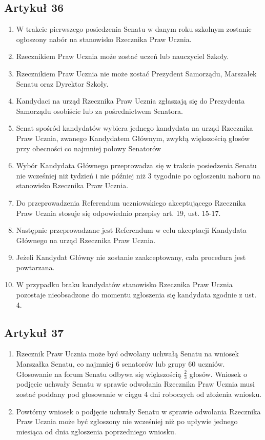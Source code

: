 \documentclass[14pt]{article}
\newenvironment{ustepy}{%
	\begin{enumerate}[leftmargin=1.5em, itemindent=1pt, labelwidth=1em, itemsep=5pt]
	}{%
	\end{enumerate}
}
\begin{document}
\subsection*{Artykuł 36}
\begin{ustepy}
	\item W trakcie pierwszego posiedzenia Senatu w danym roku szkolnym zostanie ogłoszony nabór na stanowisko Rzecznika Praw Ucznia.
	\item Rzecznikiem Praw Ucznia może zostać uczeń lub nauczyciel Szkoły.
	\item Rzecznikiem Praw Ucznia nie może zostać Prezydent Samorządu, Marszałek Senatu oraz Dyrektor Szkoły.
	\item Kandydaci na urząd Rzecznika Praw Ucznia zgłaszają się do Prezydenta  Samorządu osobiście lub za pośrednictwem Senatora.
	\item Senat spośród kandydatów wybiera jednego kandydata na urząd Rzecznika Praw Ucznia, zwanego Kandydatem Głównym, zwykłą większością głosów przy obecności co najmniej połowy Senatorów
	\item Wybór Kandydata Głównego przeprowadza się w trakcie posiedzenia Senatu nie wcześniej niż tydzień i nie później niż 3 tygodnie po ogłoszeniu naboru na stanowisko Rzecznika Praw Ucznia.
	\item Do przeprowadzenia Referendum uczniowskiego akceptującego Rzecznika Praw Ucznia stosuje się odpowiednio przepisy art. 19, ust. 15-17.
	\item Następnie przeprowadzane jest Referendum w celu akceptacji Kandydata Głównego na urząd Rzecznika Praw Ucznia.
	\item Jeżeli Kandydat Główny nie zostanie zaakceptowany, cała procedura jest powtarzana.
	\item W przypadku braku kandydatów stanowisko Rzecznika Praw Ucznia pozostaje nieobsadzone do momentu zgłoszenia się kandydata zgodnie z ust. 4. 
	\end{ustepy}
\subsection*{Artykuł 37}
\begin{ustepy}
	\item Rzecznik Praw Ucznia może być odwołany uchwałą Senatu na wniosek Marszałka Senatu, co najmniej 6 senatorów lub grupy 60 uczniów. Głosowanie na forum Senatu odbywa się większością \(\frac{2}{3}\) głosów. Wniosek o podjęcie uchwały Senatu w sprawie odwołania Rzecznika Praw Ucznia musi zostać poddany pod głosowanie w ciągu 4 dni roboczych od złożenia wniosku.
	\item Powtórny wniosek o podjęcie uchwały Senatu w sprawie odwołania Rzecznika Praw Ucznia może być zgłoszony nie wcześniej niż po upływie jednego miesiąca od dnia zgłoszenia poprzedniego wniosku.
\end{ustepy}
\end{document}
